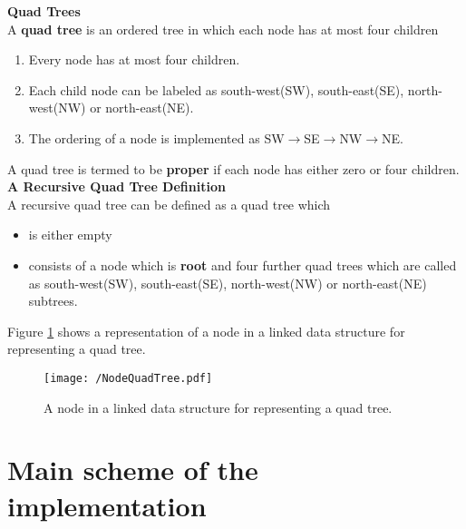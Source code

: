 		\textbf{Quad Trees}\\
		
		A \textbf{quad tree} is an ordered tree in which each node has at most four children
		\begin{enumerate}
			\item Every node has at most four children.
			\item Each child node can be labeled as south-west(SW), south-east(SE), north-west(NW) or north-east(NE).
			\item The ordering of a node is implemented as SW$\rightarrow$SE$\rightarrow$NW$\rightarrow$NE. 
		\end{enumerate}
		A quad tree is termed to be \textbf{proper} if each node has either zero or four children.\\
		
		\textbf{A Recursive Quad Tree Definition}\\
		A recursive quad tree can be defined as a quad tree which
		\begin{itemize}
			\item is either empty
			\item consists of a node which is \textbf{root} and four further quad trees which are called as south-west(SW), south-east(SE), north-west(NW) or north-east(NE) subtrees. 
		\end{itemize}
		 
		 Figure \ref{fig:NodeQuadTree1} shows a representation of a node in a linked data structure for representing a quad tree.
		 		
		 \begin{figure}[h]
		 	\centering
		 	\texttt{[image: /NodeQuadTree.pdf]}
		 	\caption{A node in a linked data structure for representing a quad tree.}
		 	\label{fig:NodeQuadTree1}
		 \end{figure}

 \section{Main scheme of the implementation}
 
